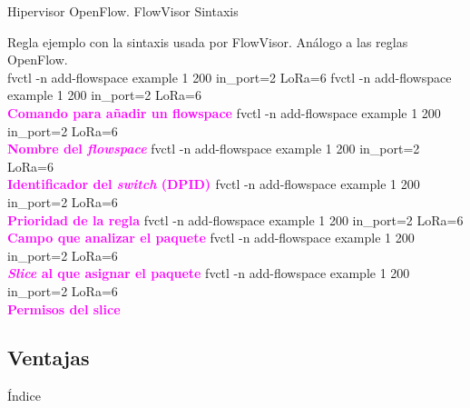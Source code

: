 \documentclass{beamer}
\begin{document}
\begin{frame}{Hipervisor OpenFlow. FlowVisor Sintaxis}\vspace{25pt}
   \begin{overlayarea}{\textwidth}{6cm}
   Regla ejemplo con la sintaxis usada por FlowVisor. Análogo a las reglas OpenFlow.\vspace{15pt}\\
    {fvctl -n add-flowspace example 1 200 in\_port=2 LoRa=6}
    {\alert{fvctl -n add-flowspace} example 1 200 in\_port=2 LoRa=6\\[20pt] 
            \centering \large \textbf{\textcolor{magenta}{Comando para añadir un flowspace}}}
    {fvctl -n add-flowspace \alert{example} 1 200 in\_port=2 LoRa=6\\[20pt] 
            \centering \large \textbf{\textcolor{magenta}{Nombre del \textit{flowspace}}}}
    {fvctl -n add-flowspace example \alert{1} 200 in\_port=2 LoRa=6\\[20pt] 
            \centering \large \textbf{\textcolor{magenta}{Identificador del \textit{switch} (DPID) }}}
    {fvctl -n add-flowspace example 1 \alert{200} in\_port=2 LoRa=6\\[20pt] 
            \centering \large \textbf{\textcolor{magenta}{Prioridad de la regla}}}
    {fvctl -n add-flowspace example 1 200 \alert{in\_port=2} LoRa=6\\[20pt] 
            \centering \large \textbf{\textcolor{magenta}{Campo que analizar el paquete}}}
    {fvctl -n add-flowspace example 1 200 in\_port=2 \alert{LoRa}=6\\[20pt] 
            \centering \large \textbf{\textcolor{magenta}{\textit{Slice} al que asignar el paquete}}}
    {fvctl -n add-flowspace example 1 200 in\_port=2 LoRa\alert{=6}\\[20pt] 
            \centering \large \textbf{\textcolor{magenta}{Permisos del slice}}}
    \end{overlayarea}
\end{frame}

\subsection{Ventajas}
\begin{frame}{Índice}
    \begin{columns}[t]
        \begin{column}{1.7in}
            \tableofcontents[currentsection, subsectionstyle=show/shaded/hide, sections={1-4}]
        \end{column}
        \begin{column}{1.7in}
            \tableofcontents[currentsection, subsectionstyle=show/shaded/hide, sections={5-7}]
        \end{column}
    \end{columns}
\end{frame}
\end{document}

